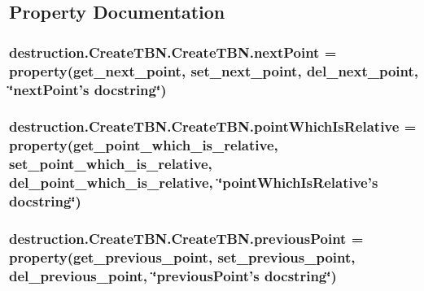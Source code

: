 \subsection{Property Documentation}
\hypertarget{classdestruction_1_1_create_t_b_n_1_1_create_t_b_n_adab2d1fa97e15afccd8a0dd0453d0e44}{
\subsubsection[{next\-Point}]{\setlength{\rightskip}{0pt plus 5cm}destruction.\-Create\-T\-B\-N.\-Create\-T\-B\-N.\-next\-Point = property({\bf get\-\_\-next\-\_\-point}, {\bf set\-\_\-next\-\_\-point}, {\bf del\-\_\-next\-\_\-point}, \char`\"{}next\-Point's docstring\char`\"{})\hspace{0.3cm}{\ttfamily [static]}}}\label{classdestruction_1_1_create_t_b_n_1_1_create_t_b_n_adab2d1fa97e15afccd8a0dd0453d0e44}
\hypertarget{classdestruction_1_1_create_t_b_n_1_1_create_t_b_n_a9815988f7a089bd24ab5ef5565b92cd7}{
\subsubsection[{point\-Which\-Is\-Relative}]{\setlength{\rightskip}{0pt plus 5cm}destruction.\-Create\-T\-B\-N.\-Create\-T\-B\-N.\-point\-Which\-Is\-Relative = property({\bf get\-\_\-point\-\_\-which\-\_\-is\-\_\-relative}, {\bf set\-\_\-point\-\_\-which\-\_\-is\-\_\-relative}, {\bf del\-\_\-point\-\_\-which\-\_\-is\-\_\-relative}, \char`\"{}point\-Which\-Is\-Relative's docstring\char`\"{})\hspace{0.3cm}{\ttfamily [static]}}}\label{classdestruction_1_1_create_t_b_n_1_1_create_t_b_n_a9815988f7a089bd24ab5ef5565b92cd7}
\hypertarget{classdestruction_1_1_create_t_b_n_1_1_create_t_b_n_a93f27496286b397430688526b3bd38f8}{
\subsubsection[{previous\-Point}]{\setlength{\rightskip}{0pt plus 5cm}destruction.\-Create\-T\-B\-N.\-Create\-T\-B\-N.\-previous\-Point = property({\bf get\-\_\-previous\-\_\-point}, {\bf set\-\_\-previous\-\_\-point}, {\bf del\-\_\-previous\-\_\-point}, \char`\"{}previous\-Point's docstring\char`\"{})\hspace{0.3cm}{\ttfamily [static]}}}\label{classdestruction_1_1_create_t_b_n_1_1_create_t_b_n_a93f27496286b397430688526b3bd38f8}
